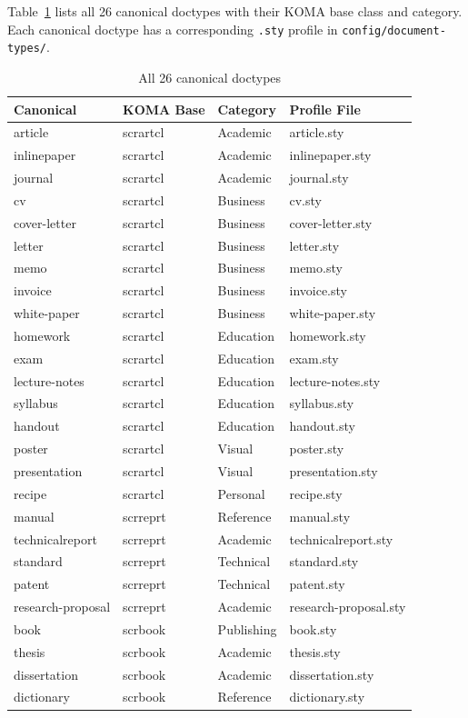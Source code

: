 Table~\ref{tab:canonical-doctypes} lists all 26 canonical doctypes with
their KOMA base class and category.  Each canonical doctype has a
corresponding \texttt{.sty} profile in \texttt{config/document-types/}.

\begin{table}[htbp]
    \centering
    \caption{All 26 canonical doctypes}
    \label{tab:canonical-doctypes}
    \begin{tabular}{@{} l l l l @{}}
        \toprule
        \textbf{Canonical} & \textbf{KOMA Base} & \textbf{Category} &
        \textbf{Profile File} \\
        \midrule
        article & scrartcl & Academic & article.sty \\
        inlinepaper & scrartcl & Academic & inlinepaper.sty \\
        journal & scrartcl & Academic & journal.sty \\
        cv & scrartcl & Business & cv.sty \\
        cover-letter & scrartcl & Business & cover-letter.sty \\
        letter & scrartcl & Business & letter.sty \\
        memo & scrartcl & Business & memo.sty \\
        invoice & scrartcl & Business & invoice.sty \\
        white-paper & scrartcl & Business & white-paper.sty \\
        homework & scrartcl & Education & homework.sty \\
        exam & scrartcl & Education & exam.sty \\
        lecture-notes & scrartcl & Education & lecture-notes.sty \\
        syllabus & scrartcl & Education & syllabus.sty \\
        handout & scrartcl & Education & handout.sty \\
        poster & scrartcl & Visual & poster.sty \\
        presentation & scrartcl & Visual & presentation.sty \\
        recipe & scrartcl & Personal & recipe.sty \\
        \midrule
        manual & scrreprt & Reference & manual.sty \\
        technicalreport & scrreprt & Academic & technicalreport.sty \\
        standard & scrreprt & Technical & standard.sty \\
        patent & scrreprt & Technical & patent.sty \\
        research-proposal & scrreprt & Academic & research-proposal.sty \\
        \midrule
        book & scrbook & Publishing & book.sty \\
        thesis & scrbook & Academic & thesis.sty \\
        dissertation & scrbook & Academic & dissertation.sty \\
        dictionary & scrbook & Reference & dictionary.sty \\
        \bottomrule
    \end{tabular}
\end{table}

